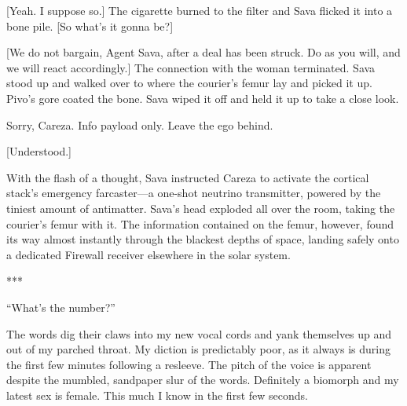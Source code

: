 [Yeah. I suppose so.] The cigarette burned to the filter and Sava
flicked it into a bone pile. [So what's it gonna be?]

[We do not bargain, Agent Sava, after a deal has been struck. Do as
you will, and we will react accordingly.] The connection with the
woman terminated. Sava stood up and walked over to where the courier's
femur lay and picked it up. Pivo's gore coated the bone. Sava wiped it
off and held it up to take a close look.

Sorry, Careza. Info payload only. Leave the ego behind.

[Understood.]

With the flash of a thought, Sava instructed Careza to activate the
cortical stack's emergency farcaster—a one-shot neutrino transmitter,
powered by the tiniest amount of antimatter. Sava's head exploded all
over the room, taking the courier's femur with it. The information
contained on the femur, however, found its way almost instantly
through the blackest depths of space, landing safely onto a dedicated
Firewall receiver elsewhere in the solar system.

\begin{center}
  ***
\end{center}

``What's the number?''

The words dig their claws into my new vocal cords and yank themselves
up and out of my parched throat. My diction is predictably poor, as it
always is during the first few minutes following a resleeve. The pitch
of the voice is apparent despite the mumbled, sandpaper slur of the
words.  Definitely a biomorph and my latest sex is female. This much I
know in the first few seconds.

